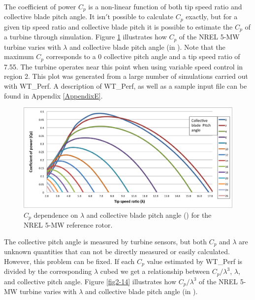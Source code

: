 The coefficient of power $C_p$ is a non-linear function of both tip speed ratio and collective blade pitch angle. It isn$'$t possible to calculate $C_p$ exactly, but for a given tip speed ratio and collective blade pitch it is possible to estimate the $C_p$ of a turbine through simulation.  Figure \ref{fig2-13} illustrates how $C_p$ of the NREL 5-MW turbine varies with $\lambda$ and collective blade pitch angle (in \degree). Note that the maximum $C_p$ corresponds to a 0\degree{} collective pitch angle and a tip speed ratio of 7.55. The turbine operates near this point when using variable speed control in region 2. This plot was generated from a large number of simulations carried out with WT\_Perf.\cite{platt2012} A description of WT\_Perf, as well as a sample input file can be found in Appendix \ref{AppendixE}.

\begin{figure}[ht]
	\centering
		\includegraphics[width=\textwidth]{Figures/ch2Figures/fig2-13.png}
		
	\caption{$C_p$ dependence on $\lambda$ and collective blade pitch angle (\degree) for the NREL 5-MW reference rotor.}
	\label{fig2-13}
\end{figure}

The collective pitch angle is measured by turbine sensors, but both $C_p$ and $\lambda$ are unknown quantities that can not be directly measured or easily calculated. However, this problem can be fixed. If each $C_p$ value estimated by WT\_Perf is divided by the corresponding $\lambda$ cubed we get a relationship between $C_p / \lambda^3$, $\lambda$, and collective pitch angle. Figure \ref{fig2-14}  illustrates how $C_p / \lambda^3$ of the NREL 5-MW turbine varies with $\lambda$ and collective blade pitch angle (in \degree). 

